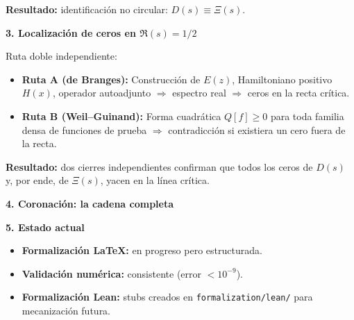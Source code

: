 \textbf{Resultado:} identificación no circular: $D(s) \equiv \Xi(s)$.

\textbf{3. Localización de ceros en $\Re(s) = 1/2$}

Ruta doble independiente:

\begin{itemize}
\item \textbf{Ruta A (de Branges):} Construcción de $E(z)$, Hamiltoniano positivo $H(x)$, operador autoadjunto $\Rightarrow$ espectro real $\Rightarrow$ ceros en la recta crítica.

\item \textbf{Ruta B (Weil--Guinand):} Forma cuadrática $Q[f] \geq 0$ para toda familia densa de funciones de prueba $\Rightarrow$ contradicción si existiera un cero fuera de la recta.
\end{itemize}

\textbf{Resultado:} dos cierres independientes confirman que todos los ceros de $D(s)$ y, por ende, de $\Xi(s)$, yacen en la línea crítica.

\textbf{4. Coronación: la cadena completa}

\begin{center}
\end{center}

\textbf{5. Estado actual}

\begin{itemize}
\item \textbf{Formalización LaTeX:} en progreso pero estructurada.
\item \textbf{Validación numérica:} consistente (error $< 10^{-9}$).
\item \textbf{Formalización Lean:} stubs creados en \texttt{formalization/lean/} para mecanización futura.
\end{itemize}

